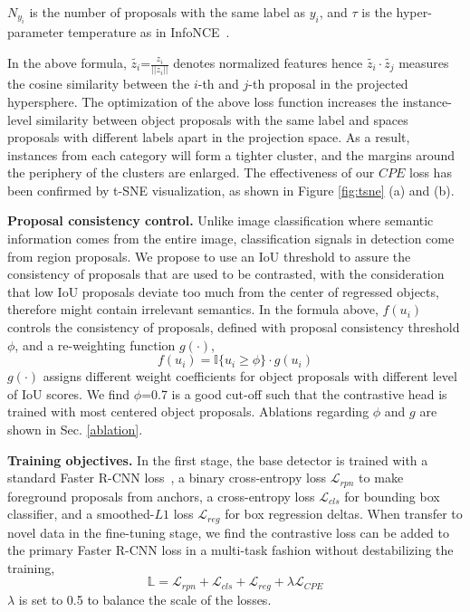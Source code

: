 \documentclass[final]{cvpr}
\begin{document}
 $N_{y_i}$ is the number of proposals with the same label as $y_i$, and $\tau$ is the hyper-parameter temperature as in InfoNCE~\cite{oord_representation_2019}.
 
In the above formula, $\tilde{z_i}$=$\frac{z_i}{||z_i||}$ denotes normalized features hence $\tilde{z_i}\cdot\tilde{z_j}$ measures the cosine similarity between the $i$-th and $j$-th proposal in the projected hypersphere. The optimization of the above loss function increases the instance-level similarity between object proposals with the same label and spaces proposals with different labels apart in the projection space. As a result, instances from each category will form a tighter cluster, and the margins around the periphery of the clusters are enlarged. The effectiveness of our $CPE$ loss has been confirmed by t-SNE visualization, as shown in Figure \ref{fig:tsne} (a) and (b).   

\textbf{Proposal consistency control.} Unlike image classification where semantic information comes from the entire image, classification signals in detection come from region proposals. We propose to use an IoU threshold to assure the consistency of proposals that are used to be contrasted, with the consideration that low IoU proposals deviate too much from the center of regressed objects, therefore might contain irrelevant semantics. In the formula above, $f(u_i)$ controls the consistency of proposals, defined with proposal consistency threshold $\phi$, and a re-weighting function $g(\cdot)$,
\begin{equation}
	f(u_i) = \mathbb{I}\{u_i\geqslant \phi\}\cdot g(u_i) \label{loss6}
\end{equation}
$g(\cdot)$ assigns different weight coefficients for object proposals with different level of IoU scores. We find $\phi$=0.7 is a good cut-off such that the contrastive head is trained with most centered object proposals. Ablations regarding $\phi$ and $g$ are shown in Sec. \ref{ablation}. 

\textbf{Training objectives.} In the first stage, the base detector is trained with a standard Faster R-CNN loss~\cite{ren_faster_2016}, a binary cross-entropy loss $\mathcal{L}_{rpn}$ to make foreground proposals from anchors, a cross-entropy loss $\mathcal{L}_{cls}$ for bounding box classifier, and a smoothed-$L1$ loss $\mathcal{L}_{reg}$ for box regression deltas. When transfer to novel data in the fine-tuning stage, we find the contrastive loss can be added to the primary Faster R-CNN loss in a multi-task fashion without destabilizing the training,
\begin{equation}
    \mathbb{L} = \mathcal{L}_{rpn} + \mathcal{L}_{cls} + \mathcal{L}_{reg} + \lambda\mathcal{L}_{CPE}
\end{equation}
$\lambda$ is set to 0.5 to balance the scale of the losses.
\end{document}
